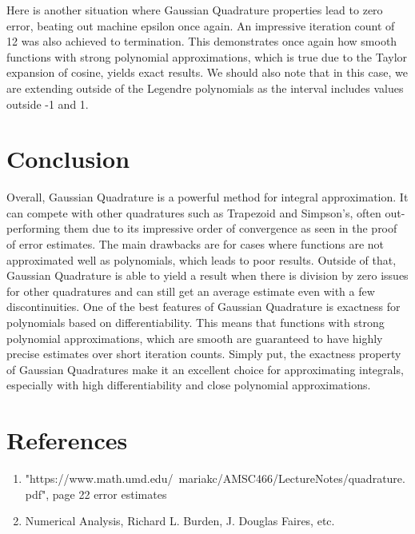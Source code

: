 \documentclass[12pt]{article}
\begin{document}
Here is another situation where Gaussian Quadrature properties lead to zero error, beating out machine epsilon once again. An impressive iteration count of 12 was also achieved to termination. This demonstrates once again how smooth functions with strong polynomial approximations, which is true due to the Taylor expansion of cosine, yields exact results. We should also note that in this case, we are extending outside of the Legendre polynomials as the interval includes values outside -1 and 1.

\section{Conclusion}

Overall, Gaussian Quadrature is a powerful method for integral approximation. It can compete with other quadratures such as Trapezoid and Simpson's, often out-performing them due to its impressive order of convergence as seen in the proof of error estimates. The main drawbacks are for cases where functions are not approximated well as polynomials, which leads to poor results. Outside of that, Gaussian Quadrature is able to yield a result when there is division by zero issues for other quadratures and can still get an average estimate even with a few discontinuities. One of the best features of Gaussian Quadrature is exactness for polynomials based on differentiability. This means that functions with strong polynomial approximations, which are smooth are guaranteed to have highly precise estimates over short iteration counts. Simply put, the exactness property of Gaussian Quadratures make it an excellent choice for approximating integrals, especially with high differentiability and close polynomial approximations.


\newpage
\section{References}

\begin{enumerate}
	\item "https://www.math.umd.edu/~mariakc/AMSC466/LectureNotes/quadrature.pdf", page 22 error estimates
	\item Numerical Analysis, Richard L. Burden, J. Douglas Faires, etc.
\end{enumerate}
\end{document}
